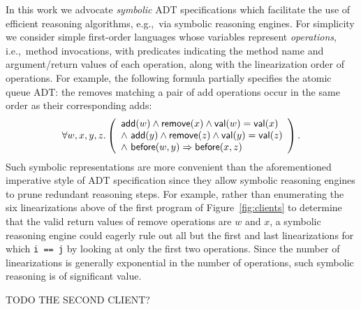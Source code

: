 In this work we advocate \emph{symbolic} ADT specifications which facilitate the
use of efficient reasoning algorithms, e.g.,~via symbolic reasoning engines. For
simplicity we consider simple first-order languages whose variables represent
\emph{operations}, i.e.,~method invocations, with predicates indicating the
method name and argument/return values of each operation, along with the
linearization order of operations. For example, the following formula partially
specifies the atomic queue ADT: the removes matching a pair of add operations
occur in the same order as their corresponding adds:
\begin{align*}
  \forall w,x,y,z.\left(
    \begin{array}{l}
      {\sf add}(w) \land {\sf remove}(x) \land {\sf val}(w) = {\sf val}(x) \\
      \land\ {\sf add}(y) \land {\sf remove}(z) \land {\sf val}(y) = {\sf val}(z) \\
      \land\ {\sf before}(w,y) \implies {\sf before}(x,z)
    \end{array}
  \right).
\end{align*}
Such symbolic representations are more convenient than the aforementioned
imperative style of ADT specification since they allow symbolic reasoning
engines to prune redundant reasoning steps. For example, rather than enumerating
the six linearizations above of the first program of Figure~\ref{fig:clients} to
determine that the valid return values of remove operations are $w$ and $x$, a
symbolic reasoning engine could eagerly rule out all but the first and last
linearizations for which {\tt i == j} by looking at only the first two
operations. Since the number of linearizations is generally exponential in the
number of operations, such symbolic reasoning is of significant value.

TODO THE SECOND CLIENT?

